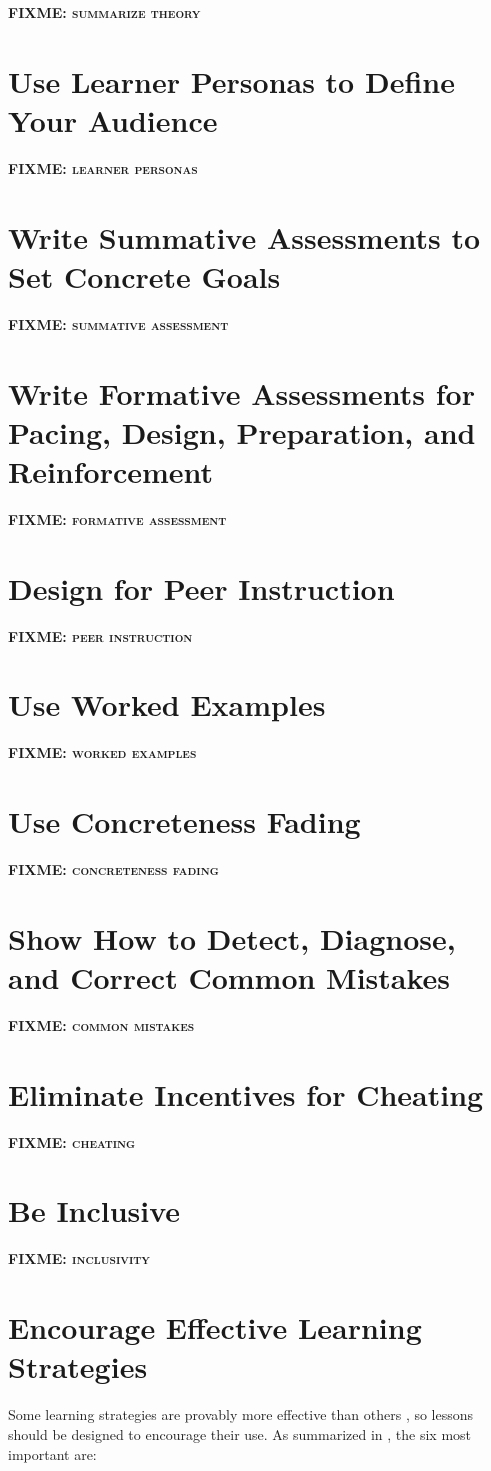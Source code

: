 \documentclass[10pt,letterpaper]{article}
\newcommand{\fixme}[1]{\textsc{\textbf{FIXME: {#1}}}}
\newcommand{\rulemajor}[1]{\section{#1}}
\begin{document}
\fixme{summarize theory}

\rulemajor{Use Learner Personas to Define Your Audience}

\fixme{learner personas}

\rulemajor{Write Summative Assessments to Set Concrete Goals}

\fixme{summative assessment}

\rulemajor{Write Formative Assessments for Pacing, Design, Preparation, and Reinforcement}

\fixme{formative assessment}

\rulemajor{Design for Peer Instruction}

\fixme{peer instruction}

\rulemajor{Use Worked Examples}

\fixme{worked examples}

\rulemajor{Use Concreteness Fading}

\fixme{concreteness fading}

\rulemajor{Show How to Detect, Diagnose, and Correct Common Mistakes}

\fixme{common mistakes}

\rulemajor{Eliminate Incentives for Cheating}

\fixme{cheating}

\rulemajor{Be Inclusive}

\fixme{inclusivity}

\rulemajor{Encourage Effective Learning Strategies}

Some learning strategies are provably more effective than others \cite{Rohr2015,Kang2016,Miya2018},
so lessons should be designed to encourage their use.
As summarized in \cite{Wein2018a,Wein2018b},
the six most important are:
\end{document}
